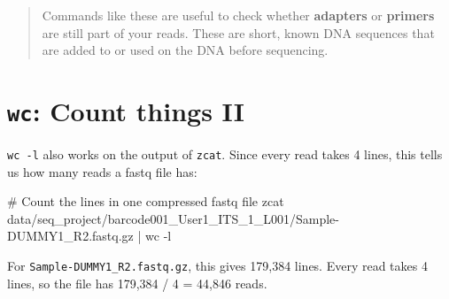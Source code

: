 \documentclass[
  letterpaper,
  DIV=11,
  numbers=noendperiod]{scrreprt}
\newenvironment{Shaded}{}{}
\newcommand{\AttributeTok}[1]{\textcolor[rgb]{0.84,0.23,0.29}{#1}}
\newcommand{\CommentTok}[1]{\textcolor[rgb]{0.42,0.45,0.49}{#1}}
\newcommand{\FunctionTok}[1]{\textcolor[rgb]{0.44,0.26,0.76}{#1}}
\newcommand{\KeywordTok}[1]{\textcolor[rgb]{0.84,0.23,0.29}{#1}}
\newcommand{\NormalTok}[1]{\textcolor[rgb]{0.14,0.16,0.18}{#1}}
\begin{document}
\begin{tcolorbox}
\begin{quote}
Commands like these are useful to check whether \textbf{adapters} or
\textbf{primers} are still part of your reads. These are short, known
DNA sequences that are added to or used on the DNA before sequencing.
\end{quote}

\end{tcolorbox}

\section{\texorpdfstring{\texttt{wc}: Count things
II}{wc: Count things II}}\label{wc-count-things-ii}

\texttt{wc\ -l} also works on the output of \texttt{zcat}. Since every
read takes 4 lines, this tells us how many reads a fastq file has:

\begin{Shaded}
\begin{Highlighting}[]
\CommentTok{\# Count the lines in one compressed fastq file}
\FunctionTok{zcat}\NormalTok{ data/seq\_project/barcode001\_User1\_ITS\_1\_L001/Sample{-}DUMMY1\_R2.fastq.gz }\KeywordTok{|} \FunctionTok{wc} \AttributeTok{{-}l}
\end{Highlighting}
\end{Shaded}

For \texttt{Sample-DUMMY1\_R2.fastq.gz}, this gives 179,384 lines. Every
read takes 4 lines, so the file has 179,384 / 4 = 44,846 reads.
\end{document}
